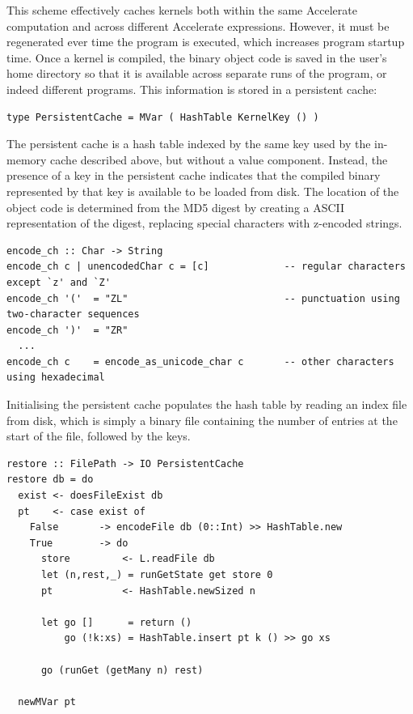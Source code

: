 This scheme effectively caches kernels both within the same Accelerate
computation and across different Accelerate expressions. However, it must be
regenerated ever time the program is executed, which increases program startup
time. Once a kernel is compiled, the binary object code is saved in the user's
home directory so that it is available across separate runs of the program, or
indeed different programs. This information is stored in a persistent cache:
%
\begin{lstlisting}[style=haskell,numbers=none]
type PersistentCache = MVar ( HashTable KernelKey () )
\end{lstlisting}

The persistent cache is a hash table indexed by the same key used by the
in-memory cache described above, but without a value component. Instead, the
presence of a key in the persistent cache indicates that the compiled binary
represented by that key is available to be loaded from disk. The location of the
object code is determined from the MD5 digest by creating a ASCII representation
of the digest, replacing special characters with z-encoded strings.
%
\begin{lstlisting}[style=haskell]
encode_ch :: Char -> String
encode_ch c | unencodedChar c = [c]             -- regular characters except `z' and `Z'
encode_ch '('  = "ZL"                           -- punctuation using two-character sequences
encode_ch ')'  = "ZR"
  ...
encode_ch c    = encode_as_unicode_char c       -- other characters using hexadecimal
\end{lstlisting}

Initialising the persistent cache populates the hash table by reading an index
file from disk, which is simply a binary file containing the number of entries
at the start of the file, followed by the keys.
%
\begin{lstlisting}[style=haskell]
restore :: FilePath -> IO PersistentCache
restore db = do
  exist <- doesFileExist db
  pt    <- case exist of
    False       -> encodeFile db (0::Int) >> HashTable.new
    True        -> do
      store         <- L.readFile db
      let (n,rest,_) = runGetState get store 0
      pt            <- HashTable.newSized n

      let go []      = return ()
          go (!k:xs) = HashTable.insert pt k () >> go xs

      go (runGet (getMany n) rest)

  newMVar pt
\end{lstlisting}

